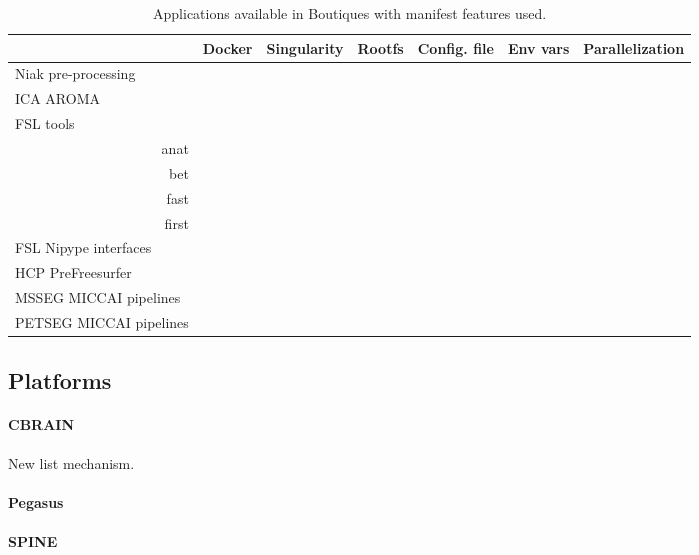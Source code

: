 \documentclass{article}
\begin{document}
\begin{table}
\begin{tabular}{l|ccc|ccc}
    \rowcolor[gray]{0.9}
    &Docker              & Singularity & Rootfs  & Config. file & Env vars  & Parallelization   \\
    \hline
    Niak pre-processing       &\cellcolor{gray!75} &            &         &              &\cellcolor{gray!75}&\cellcolor{gray!75}\\
    ICA AROMA                 &\cellcolor{gray!75} &            &         &              &&\\
    FSL tools &&&&&\\
    \multicolumn{1}{r|}{anat} &                    &            &         &              &&\\
    \multicolumn{1}{r|}{bet}  &                    &            &         &              &&\\
    \multicolumn{1}{r|}{fast} &                    &            &         &              &&\\
    \multicolumn{1}{r|}{first}&                    &            &         &              &&\\
    FSL Nipype interfaces     \\
    HCP PreFreesurfer         &\cellcolor{gray!75} &            &         &             &&\\
    MSSEG MICCAI pipelines    \\
    PETSEG MICCAI pipelines   \\
  \end{tabular} 
  \caption{Applications available in Boutiques with manifest features used.}
  \label{table:applications}
\end{table}
  
\subsection{Platforms}

\paragraph{CBRAIN}

New list mechanism.

\paragraph{Pegasus}

\paragraph{SPINE}
\end{document}
